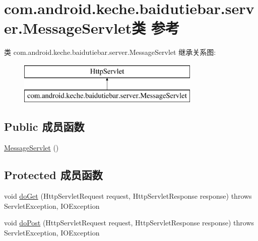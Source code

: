 \hypertarget{classcom_1_1android_1_1keche_1_1baidutiebar_1_1server_1_1_message_servlet}{}\section{com.\+android.\+keche.\+baidutiebar.\+server.\+Message\+Servlet类 参考}
\label{classcom_1_1android_1_1keche_1_1baidutiebar_1_1server_1_1_message_servlet}
类 com.\+android.\+keche.\+baidutiebar.\+server.\+Message\+Servlet 继承关系图\+:\begin{figure}[H]
\begin{center}
\leavevmode
\includegraphics[height=2.000000cm]{classcom_1_1android_1_1keche_1_1baidutiebar_1_1server_1_1_message_servlet}
\end{center}
\end{figure}
\subsection*{Public 成员函数}
\begin{DoxyCompactItemize}
\item 
\mbox{\hyperlink{classcom_1_1android_1_1keche_1_1baidutiebar_1_1server_1_1_message_servlet_aef435c6cd6a902c4509080864a588bad}{Message\+Servlet}} ()
\end{DoxyCompactItemize}
\subsection*{Protected 成员函数}
\begin{DoxyCompactItemize}
\item 
void \mbox{\hyperlink{classcom_1_1android_1_1keche_1_1baidutiebar_1_1server_1_1_message_servlet_a41a82e5e86882c5e69a120943f08f358}{do\+Get}} (Http\+Servlet\+Request request, Http\+Servlet\+Response response)  throws Servlet\+Exception, I\+O\+Exception 
\item 
void \mbox{\hyperlink{classcom_1_1android_1_1keche_1_1baidutiebar_1_1server_1_1_message_servlet_ae920f7609054c4ccff3a808c4e3ca9b0}{do\+Post}} (Http\+Servlet\+Request request, Http\+Servlet\+Response response)  throws Servlet\+Exception, I\+O\+Exception 
\end{DoxyCompactItemize}


